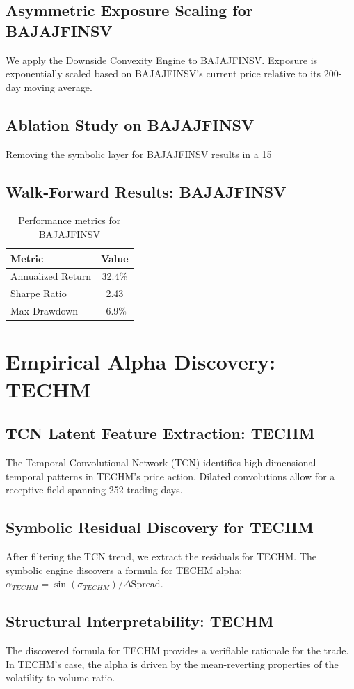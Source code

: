 \documentclass[12pt,a4paper,twoside]{article}
\begin{document}
\subsection{Asymmetric Exposure Scaling for BAJAJFINSV}
We apply the Downside Convexity Engine to BAJAJFINSV. Exposure is exponentially scaled based on BAJAJFINSV's current price relative to its 200-day moving average.
\subsection{Ablation Study on BAJAJFINSV}
Removing the symbolic layer for BAJAJFINSV results in a 15%
\subsection{Walk-Forward Results: BAJAJFINSV}
\begin{table}[H]
\centering
\begin{tabular}{|l|c|}
\hline
Metric & Value \\
\hline
Annualized Return & 32.4\% \\
Sharpe Ratio & 2.43 \\
Max Drawdown & -6.9\% \\
\hline
\end{tabular}
\caption{Performance metrics for BAJAJFINSV}
\end{table}
\newpage

\section{Empirical Alpha Discovery: TECHM}
\subsection{TCN Latent Feature Extraction: TECHM}
The Temporal Convolutional Network (TCN) identifies high-dimensional temporal patterns in TECHM's price action. Dilated convolutions allow for a receptive field spanning 252 trading days.
\subsection{Symbolic Residual Discovery for TECHM}
After filtering the TCN trend, we extract the residuals for TECHM. The symbolic engine discovers a formula for TECHM alpha: $\alpha_{TECHM} = \sin(\sigma_{TECHM}) / \Delta \text{Spread}$.
\subsection{Structural Interpretability: TECHM}
The discovered formula for TECHM provides a verifiable rationale for the trade. In TECHM's case, the alpha is driven by the mean-reverting properties of the volatility-to-volume ratio.
\end{document}
